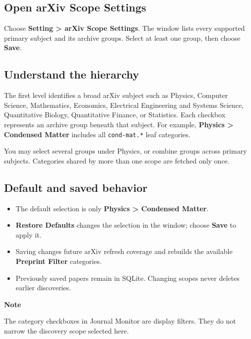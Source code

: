 \documentclass[10pt,letterpaper,oneside]{scrreprt}
\providecommand{\tightlist}{\setlength{\itemsep}{1pt}\setlength{\parskip}{0pt}}
\renewenvironment{quote}
  {\Needspace{5\baselineskip}\begin{tcolorbox}[enhanced,breakable,colback=GewuPale,colframe=GewuPale,boxrule=0pt,
    borderline west={1.6pt}{0pt}{GewuBlue},arc=1.2mm,left=2.5mm,right=2.5mm,top=1.7mm,bottom=1.7mm,
    before skip=4pt,after skip=5pt,fontupper=\color{GewuInk}\small]}
  {\end{tcolorbox}}
\begin{document}
\subsection{Open arXiv Scope Settings}\label{open-arxiv-scope-settings}

Choose \textbf{Setting \textgreater{} arXiv Scope Settings}. The window lists every supported primary subject and its archive groups. Select at least one group, then choose \textbf{Save}.

\subsection{Understand the hierarchy}\label{understand-the-hierarchy}

The first level identifies a broad arXiv subject such as Physics, Computer Science, Mathematics, Economics, Electrical Engineering and Systems Science, Quantitative Biology, Quantitative Finance, or Statistics. Each checkbox represents an archive group beneath that subject. For example, \textbf{Physics \textgreater{} Condensed Matter} includes all \texttt{cond-mat.*} leaf categories.

You may select several groups under Physics, or combine groups across primary subjects. Categories shared by more than one scope are fetched only once.

\subsection{Default and saved behavior}\label{default-and-saved-behavior}

\begin{itemize}
\tightlist
\item
  The default selection is only \textbf{Physics \textgreater{} Condensed Matter}.
\item
  \textbf{Restore Defaults} changes the selection in the window; choose \textbf{Save} to apply it.
\item
  Saving changes future arXiv refresh coverage and rebuilds the available \textbf{Preprint Filter} categories.
\item
  Previously saved papers remain in SQLite. Changing scopes never deletes earlier discoveries.
\end{itemize}

\begin{quote}
\textbf{Note}

The category checkboxes in Journal Monitor are display filters. They do not narrow the discovery scope selected here.
\end{quote}
\end{document}
